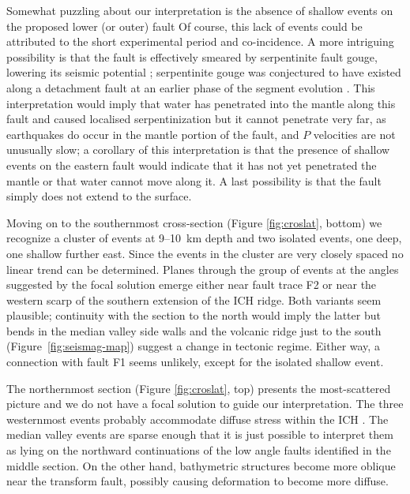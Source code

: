 \documentclass[jgr]{aguplus}
\newlength{\tw}
\begin{document}
\begin{article}
   Somewhat puzzling about our
interpretation is the absence of shallow events on the proposed lower
(or outer) fault  Of course, this lack of events could be attributed
to the short experimental period and co-incidence.  A more intriguing
possibility is that the fault is effectively
smeared by serpentinite fault gouge, lowering its seismic potential \citep{reinen00};
serpentinite gouge was conjectured to have existed along a detachment
fault at an earlier phase of the segment evolution \citep[also see
introduction]{reston02}. This interpretation would imply that water
has penetrated into the mantle along this fault and caused localised
serpentinization but it cannot penetrate very far, as earthquakes do occur in
the mantle portion of the fault, and $P$ velocities are not unusually
slow; a corollary of this interpretation is that the presence of
shallow events on the eastern fault would indicate that it has not yet
penetrated the mantle or that water cannot move along it.
A last possibility is that the fault simply does not extend to the
surface.

Moving on to the southernmost cross-section (Figure \ref{fig:croslat}, bottom)
we recognize a cluster of events at 9--10~km depth and two isolated
events, one deep, one shallow further east.  Since the events in the
cluster are very closely spaced no linear trend can be
determined. Planes through the group of events at the angles suggested
by the focal solution emerge either near fault trace F2 or near the
western scarp of the southern extension of the ICH ridge.  Both
variants seem plausible; continuity with the section to the north
would imply the latter but bends in the median valley side walls
 and the volcanic ridge just to the south (Figure~\ref{fig:seismag-map}) suggest
a change in tectonic regime.  Either way, a connection with fault F1
seems unlikely, except for the isolated shallow event.

The northernmost section (Figure \ref{fig:croslat}, top) presents the
most-scattered picture and we do not have a focal solution to guide
our interpretation.  The three westernmost events probably
accommodate diffuse stress within the ICH .  The median valley events
are sparse enough that it is just possible to interpret them as lying
on the northward continuations of the low angle faults identified in
the middle section.  On the other hand, bathymetric structures become
more oblique near the transform fault, possibly causing
deformation to become more diffuse.


\end{article}
\end{document}
